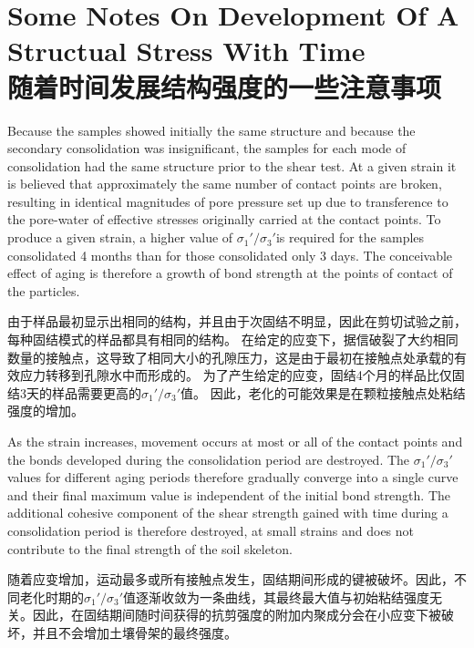 \section{Some Notes On Development Of A Structual Stress With Time \\随着时间发展结构强度的一些注意事项}

\begin{paracol}{2}
    
    Because the samples showed initially the same structure and because the secondary consolidation was insignificant, the samples for each mode of consolidation had the same structure prior to the shear test. At a given strain it is believed that approximately the same number of contact points are broken, resulting in identical magnitudes of pore pressure set up due to transference to the pore-water of effective stresses originally carried at the contact points. To produce a given strain, a higher value of $\sigma_1'/\sigma_3'$is required for the samples consolidated 4 months than for those consolidated only 3 days. The conceivable effect of aging is therefore a growth of bond strength at the points of contact of the particles.

    \switchcolumn

    由于样品最初显示出相同的结构，并且由于次固结不明显，因此在剪切试验之前，每种固结模式的样品都具有相同的结构。 在给定的应变下，据信破裂了大约相同数量的接触点，这导致了相同大小的孔隙压力，这是由于最初在接触点处承载的有效应力转移到孔隙水中而形成的。 为了产生给定的应变，固结4个月的样品比仅固结3天的样品需要更高的$\sigma_1'/\sigma_3'$值。 因此，老化的可能效果是在颗粒接触点处粘结强度的增加。

    \switchcolumn*

    As the strain increases, movement occurs at most or all of the contact points and the bonds developed during the consolidation period are destroyed. The $\sigma_1'/\sigma_3'$ values for different aging periods therefore gradually converge into a single curve and their final maximum value is independent of the initial bond strength. The additional cohesive component of the shear strength gained with time during a consolidation period is therefore destroyed, at small strains and does not contribute to the final strength of the soil skeleton.

    \switchcolumn
    
    随着应变增加，运动最多或所有接触点发生，固结期间形成的键被破坏。因此，不同老化时期的$\sigma_1'/\sigma_3'$值逐渐收敛为一条曲线，其最终最大值与初始粘结强度无关。因此，在固结期间随时间获得的抗剪强度的附加内聚成分会在小应变下被破坏，并且不会增加土壤骨架的最终强度。


\end{paracol}
